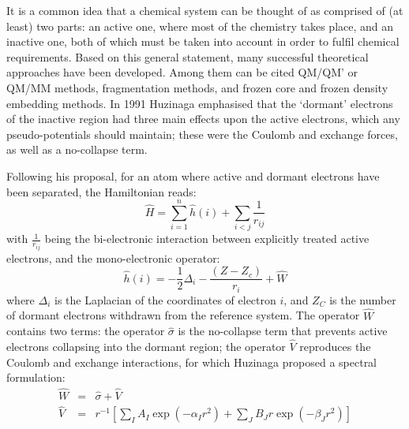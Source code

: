 \documentclass[12pt]{article}
\begin{document}
It is a common idea that a chemical system can be thought of as comprised of (at least) 
two parts:
an active one, where most of the chemistry takes place, and an inactive one, both of which must be taken into account in order to fulfil chemical requirements.
Based on this general statement, many successful theoretical approaches have been developed. Among them can be cited QM/QM' or QM/MM methods,\cite{chung_oniom_2015} fragmentation methods,
\cite{gordon_effective_2001,
steinmann_effective_2012,collins_energy-based_2015} and frozen core and frozen density embedding methods.\cite{assfeld_quantum_1996,jacob_calculation_2006,artemyev_photoelectron_2015,wesolowski_frozen-density_2015}
In 1991 Huzinaga emphasised that the `dormant' electrons of the inactive region had three main effects upon the active electrons, which any pseudo-potentials should maintain; these were the Coulomb and exchange forces, as well as a no-collapse term.\cite{huzinaga_effective_1991}

Following his proposal, for an atom where active and dormant electrons have been separated, the Hamiltonian reads:
\begin{equation}
\label{eq:atomicHamiltonian}
\hat{H} = \sum_{i=1}^n \hat{h}(i) +\sum_{i<j}\frac{1}{r_{ij}}
\end{equation}
with $\frac{1}{r_{ij}}$ being the bi-electronic interaction
between explicitly treated active electrons, and
the mono-electronic operator:
\begin{equation}
\label{eq:monoElectronicOperator}
\hat{h}(i) = -\frac{1}{2}\Delta_i - \frac{(Z-Z_c)}{r_i}+ \hat{W}
\end{equation}
where $\Delta_i$ is the Laplacian of the coordinates of electron $i$, and 
$Z_C$ is the number of dormant electrons withdrawn from the reference system.
The operator $\hat{W}$ contains two terms:
the operator $\hat{\sigma}$ is the no-collapse term that prevents active electrons
collapsing into the dormant region; the operator $\hat{V}$ reproduces the 
Coulomb and exchange interactions, for which Huzinaga proposed a spectral formulation:
\begin{eqnarray}
\label{eq:HuzinagaMPVersion1Potential}
\hat{W} &=& \hat{\sigma}+\hat{V}  \nonumber \\
\hat{V} &=& r^{-1}\left[\sum_IA_I\exp(-\alpha_I r^2)+\sum_JB_Jr\exp(-\beta_J r^2)\right]
\end{eqnarray}
\end{document}
